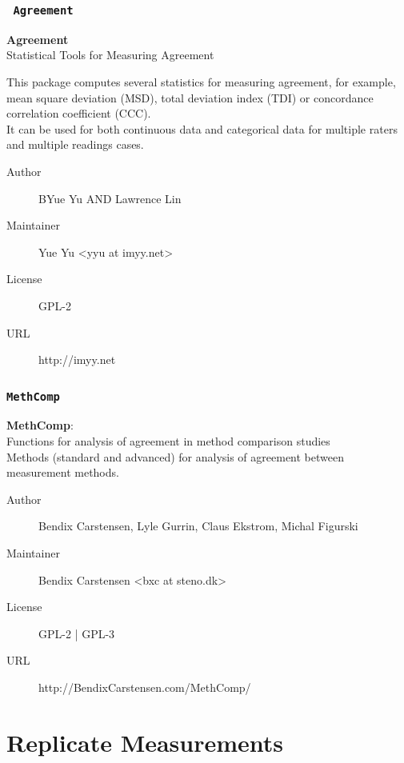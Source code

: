 \documentclass[compress]{beamer}        %
\begin{document}
\begin{frame}
\frametitle{\texttt{
Agreement} }
\textbf{Agreement}\\
 Statistical Tools for Measuring Agreement\\ \vspace{0.3cm}

This package computes several statistics for measuring agreement, for example, mean square deviation (MSD), total deviation index (TDI) or concordance correlation coefficient (CCC). \\ \vspace{0.2cm} It can be used for both continuous data and categorical data for multiple raters and multiple readings cases.

\begin{description}
\item[Author]	BYue Yu AND Lawrence Lin
\item[Maintainer]	Yue Yu <yyu at imyy.net>
\item[License]	GPL-2
\item[URL]	http://imyy.net
\end{description}

\end{frame}
\begin{frame}
\frametitle{\texttt{MethComp} }
\textbf{MethComp}:  \\ Functions for analysis of agreement in method comparison studies
\\ \vspace{0.2cm}
Methods (standard and advanced) for analysis of agreement between measurement methods.


\begin{description}
\item[Author]	Bendix Carstensen, Lyle Gurrin, Claus Ekstrom, Michal Figurski
\item[Maintainer]	Bendix Carstensen <bxc at steno.dk>
\item[License]	GPL-2 | GPL-3 
\item[URL]	http://BendixCarstensen.com/MethComp/
\end{description}

\end{frame}

\section{Replicate Measurements}
\end{document}
